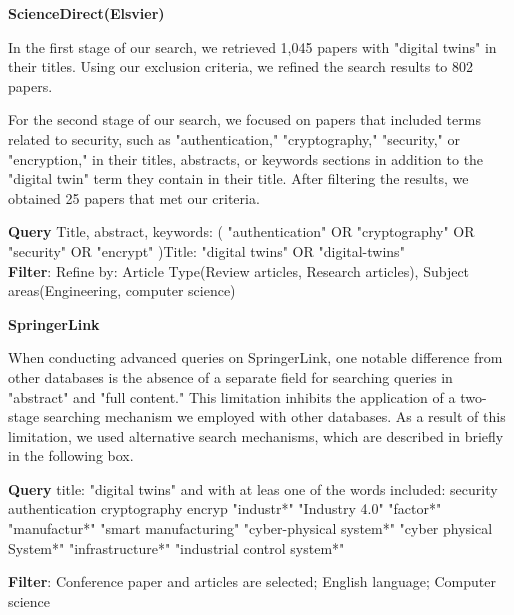 \textbf{ScienceDirect(Elsvier)}

In the first stage of our search, we retrieved 1,045 papers with "digital twins" in their titles. Using our exclusion criteria, we refined the search results to 802 papers.

For the second stage of our search, we focused on papers that included terms related to security, such as "authentication," "cryptography," "security," or "encryption," in their titles, abstracts, or keywords sections in addition to the "digital twin" term they contain in their title. After filtering the results, we obtained 25 papers that met our criteria.


\begin{tcolorbox}[colback=black!5!white, sharp corners=all, colframe=white!95!black]
\textbf{Query}
\tcblower
Title, abstract, keywords: ( "authentication" OR "cryptography" OR "security" OR "encrypt" )Title: "digital twins" OR "digital-twins"\\

\textbf{Filter}: Refine by: Article Type(Review articles, Research articles), Subject areas(Engineering, computer science) 

\end{tcolorbox}


\textbf{SpringerLink}

When conducting advanced queries on SpringerLink, one notable difference from other databases is the absence of a separate field for searching queries in "abstract" and "full content." This limitation inhibits the application of a two-stage searching mechanism we employed with other databases. 
As a result of this limitation, we used alternative search mechanisms, which are described in briefly in the following box.

\begin{tcolorbox}[colback=black!5!white, sharp corners=all, colframe=white!95!black]
\textbf{Query}
 title: "digital twins" and with at leas one of the words included: security authentication cryptography encryp "industr*"  "Industry 4.0"  "factor*" "manufactur*" "smart manufacturing"  "cyber-physical system*"  "cyber physical System*"  "infrastructure*" "industrial control system*" 

\tcblower
\textbf{Filter}: Conference paper and articles are selected; English language; Computer science

\end{tcolorbox}
